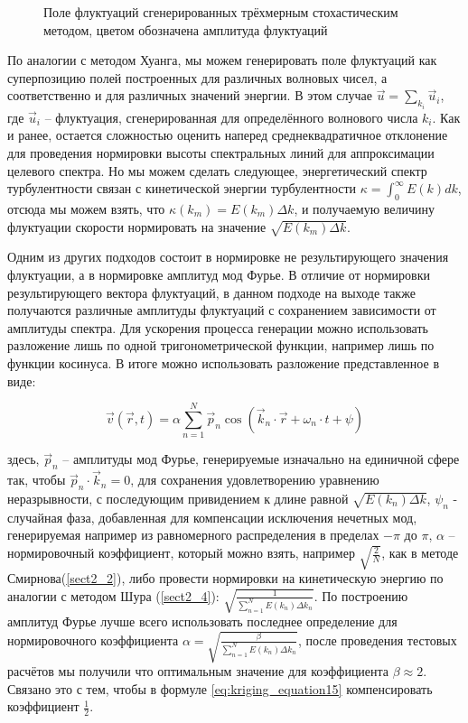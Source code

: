 \begin{figure}[!h]
{    }
    
    \caption{Поле флуктуаций сгенерированных трёхмерным стохастическим методом, цветом обозначена амплитуда флуктуаций}
    \label{img:velocity_fluctuation_field_for_spectral_2}  
\end{figure}

По аналогии с методом Хуанга, мы можем генерировать поле флуктуаций как суперпозицию полей построенных для различных волновых чисел, а соответственно и для различных значений энергии. В этом случае $\vec u = \sum_{k_{i}} \vec u_i$, где $\vec u_i$ -- флуктуация, сгенерированная для определённого волнового числа $k_i$. Как и ранее, остается сложностью оценить наперед среднеквадратичное отклонение для проведения нормировки высоты спектральных линий для аппроксимации целевого спектра. Но мы можем сделать следующее, энергетический спектр турбулентности связан с кинетической энергии турбулентности $\kappa = \int_{0}^{\infty} E(k) dk$, отсюда мы можем взять, что $\kappa(k_m) = E(k_m) \Delta k$, и получаемую величину флуктуации скорости нормировать на значение $\sqrt{E(k_m) \Delta k}$. 

Одним из других подходов состоит в нормировке не результирующего значения флуктуации, а в нормировке амплитуд мод Фурье. В отличие от нормировки результирующего вектора флуктуаций, в данном подходе на выходе также получаются различные амплитуды флуктуаций с сохранением зависимости от амплитуды спектра. Для ускорения процесса генерации можно использовать разложение лишь по одной тригонометрической функции, например лишь по функции косинуса. В итоге можно использовать разложение представленное в виде:

\begin{equation}
    \label{eq:part3_3}
    \vec v(\vec r, t) = \alpha \sum_{n = 1}^{N} \vec p_n \cos( \vec k_n \cdot \vec r + \omega_n \cdot t + \psi)  
\end{equation}

\noindent 
здесь, $\vec p_n$ -- амплитуды мод Фурье, генерируемые изначально на единичной сфере так, чтобы $\vec p_n \cdot \vec k_n = 0$, для сохранения удовлетворению уравнению неразрывности, с последующим привидением к длине равной $\sqrt{E(k_n)\Delta k}$, $\psi_n$ - случайная фаза, добавленная для компенсации исключения нечетных мод, генерируемая например из равномерного распределения в пределах $-\pi$ до $\pi$, $\alpha$ -- нормировочный коэффициент, который можно взять, например $\sqrt{\frac{2}{N}}$, как в методе Смирнова(\ref{sect2_2}), либо провести нормировки на кинетическую энергию по аналогии с методом Шура (\ref{sect2_4}): $\sqrt{\frac{1}{\sum_{n=1}^{N} E(k_n) \Delta k_n}}$. По построению амплитуд Фурье лучше всего использовать последнее определение для нормировочного коэффициента $\alpha = \sqrt{\frac{\beta}{\sum_{n=1}^{N} E(k_n) \Delta k_n}}$, после проведения тестовых расчётов мы получили что оптимальным значение для коэффициента $\beta \approx 2$. Связано это с тем, чтобы в формуле \eqref{eq:kriging_equation15} компенсировать коэффициент $\frac{1}{2}$. 

